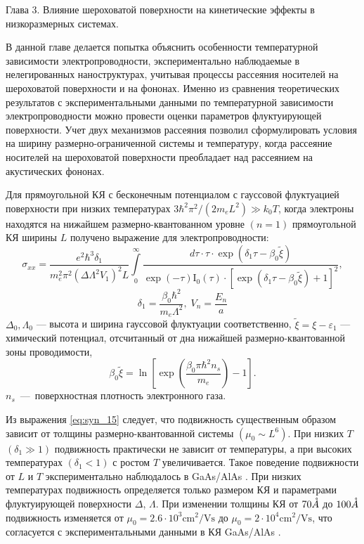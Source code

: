 Глава 3. Влияние шероховатой поверхности на кинетические эффекты в низкоразмерных системах.

В данной главе делается попытка объяснить особенности температурной зависимости электропроводности, экспериментально наблюдаемые в нелегированных наноструктурах, учитывая процессы рассеяния носителей на шероховатой поверхности и на фононах. Именно из сравнения теоретических результатов с экспериментальными данными по температурной зависимости электропроводности можно провести оценки параметров флуктуирующей поверхности. Учет двух механизмов рассеяния позволил сформулировать условия на ширину размерно-ограниченной системы и температуру, когда рассеяние носителей на шероховатой поверхности преобладает над рассеянием на акустических фононах.

Для прямоугольной КЯ с бесконечным потенциалом с гауссовой флуктуацией поверхности при низких температурах  $3\hbar^2 \pi^2 /\left(2m_e L^2 \right) \gg k_0 T$, когда электроны находятся на нижайшем размерно-квантованном уровне $(n=1)$ прямоугольной КЯ ширины $L$ получено выражение для электропроводности:
\begin{equation} \label{eq:syn_15}
\sigma _{xx} =\frac{e^2 \hbar^3 \delta_1}{m_e^2 \pi^2 \left(\Delta \Lambda^2 V_1 \right)^2 L} \int\limits_0^\infty { \frac{d\tau \cdot \tau \cdot \exp \left(\delta_1 \tau -\beta_0 \tilde{\xi }\right)}{\exp(-\tau )\mathrm{I}_0 (\tau )\cdot \left[\exp \left(\delta_1 \tau -\beta_0 \tilde{\xi }\right)+1\right]^2 }},
\end{equation}
\[
\delta_1 =\frac{\beta_0 \hbar^2 }{m_e \Lambda^2 }, \; V_n=\frac{E_n}{a}
\] 
$\Delta_0, \Lambda_0$ --- высота и ширина гауссовой флуктуации соответственно, $\tilde{\xi }=\xi -\varepsilon _{1} $ --- химический потенциал, отсчитанный от дна нижайшей размерно-квантованной зоны проводимости,
\begin{equation} \label{eq:syn_16}
\beta_0 \tilde{\xi }=\ln\left[\exp\left(\frac{\beta_0 \pi \hbar^2 n_s }{m_e} \right)-1\right].
\end{equation}
$n_s $~---~поверхностная плотность электронного газа.

Из выражения \eqref{eq:syn_15} следует, что подвижность существенным образом зависит от толщины размерно-квантованной системы $(\mu_0 \sim L^6 )$. При низких $T$ $(\delta_1 \gg 1)$ подвижность практически не зависит от температуры, а при высоких температурах $(\delta_1 <1)$ с ростом $T$ увеличивается. Такое поведение подвижности от $L$ и $T$ экспериментально наблюдалось в GaAs/AlAs \cite{Sakaki1987}. При низких температурах подвижность определяется только размером КЯ и параметрами флуктуирующей поверхности $\Delta $, $\Lambda $. При изменении толщины КЯ от $70 \AA$ до $100 \AA$ подвижность изменяется от $\mu_0 =2.6\cdot 10^3 \text{cm}^2 / \text{Vs}$ до $\mu_0 =2\cdot 10^4 \text{cm}^2 /\text{Vs}$, что согласуется с экспериментальными данными в КЯ GaAs/AlAs \cite{Sakaki1987}.

